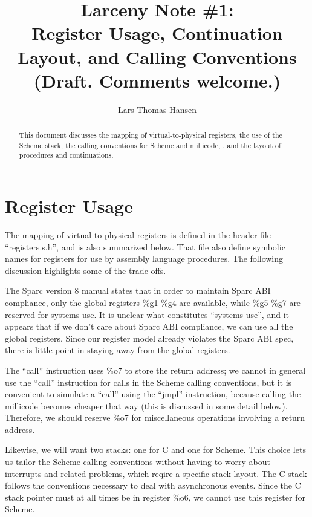 


\title{Larceny Note \#1: \\
       Register Usage, Continuation Layout, and Calling Conventions \\
       {\tenrm (Draft. Comments welcome.)}}
\author{Lars Thomas Hansen}


\maketitle

\begin{abstract}
This document discusses the mapping of virtual-to-physical registers, the
use of the Scheme stack, the calling conventions for Scheme and millicode, ,
and the layout of procedures and continuations.
\end{abstract}

\section{Register Usage}

The mapping of virtual to physical registers is defined in the header
file ``registers.s.h'', and is also summarized below. That file
also define symbolic names for registers for use by assembly language
procedures.  The following discussion highlights some of the
trade-offs.

The Sparc version 8 manual states that in order to maintain Sparc ABI
compliance, only the global registers \%g1-\%g4 are available, while
\%g5-\%g7 are reserved for systems use. It is unclear what constitutes
``systems use'', and it appears that if we don't care about Sparc ABI
compliance, we can use all the global registers. Since our register
model already violates the Sparc ABI spec, there is little point in
staying away from the global registers.

The ``call'' instruction uses \%o7 to store the return address; we
cannot in general use the ``call'' instruction for calls in the Scheme calling
conventions, but it is convenient to simulate a ``call'' using
the ``jmpl'' instruction, because calling the millicode becomes
cheaper that way (this is discussed in some detail below).  Therefore,
we should reserve \%o7 for miscellaneous operations involving a return
address.

Likewise, we will want two stacks: one for C and one for Scheme. This
choice lets us tailor the Scheme calling conventions without having to
worry about interrupts and related problems, which reqire a specific
stack layout. The C stack follows the conventions necessary to deal
with asynchronous events. Since the C stack pointer must at all times
be in register \%o6, we cannot use this register for Scheme.

